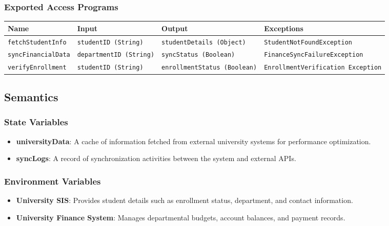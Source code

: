 \documentclass[12pt, titlepage]{article}
\begin{document}
\subsubsection{Exported Access Programs}
\begin{center}
    \scriptsize
    \begin{tabular}{|p{3cm}|p{4cm}|p{4cm}|p{4cm}|}
        \hline
        \textbf{Name} & \textbf{Input} & \textbf{Output} & \textbf{Exceptions} \\
        \hline
        \texttt{fetchStudentInfo} & \texttt{studentID (String)} & \texttt{studentDetails (Object)} & \texttt{StudentNotFoundException} \\
        \hline
        \texttt{syncFinancialData} & \texttt{departmentID (String)} & \texttt{syncStatus (Boolean)} & \texttt{FinanceSyncFailureException} \\
        \hline
        \texttt{verifyEnrollment} & \texttt{studentID (String)} & \texttt{enrollmentStatus (Boolean)} & \texttt{EnrollmentVerification \newline Exception} \\
        \hline
    \end{tabular}
\end{center}

\subsection{Semantics}

\subsubsection{State Variables}
\begin{itemize}
    \item \textbf{universityData}: A cache of information fetched from external university systems for performance optimization.
    \item \textbf{syncLogs}: A record of synchronization activities between the system and external APIs.
\end{itemize}

\subsubsection{Environment Variables}
\begin{itemize}
    \item \textbf{University SIS}: Provides student details such as enrollment status, department, and contact information.
    \item \textbf{University Finance System}: Manages departmental budgets, account balances, and payment records.
\end{itemize}
\end{document}
